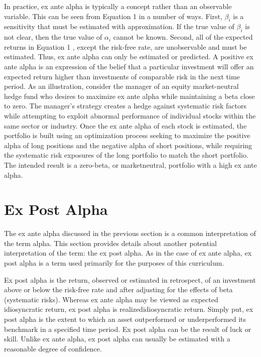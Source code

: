 \documentclass[11pt]{article}
\begin{document}
In practice, ex ante alpha is typically a concept rather than an observable variable. This can be seen from Equation 1 in a number of ways. First, $\beta_{i}$ is a sensitivity that must be estimated with approximation. If the true value of $\beta_{i}$ is not clear, then the true value of $\alpha_{i}$ cannot be known. Second, all of the expected returns in Equation 1 , except the risk-free rate, are unobservable and must be estimated. Thus, ex ante alpha can only be estimated or predicted. A positive ex ante alpha is an expression of the belief that a particular investment will offer an expected return higher than investments of comparable risk in the next time period. As an illustration, consider the manager of an equity market-neutral hedge fund who desires to maximize ex ante alpha while maintaining a beta close to zero. The manager's strategy creates a hedge against systematic risk factors while attempting to exploit abnormal performance of individual stocks within the same sector or industry. Once the ex ante alpha of each stock is estimated, the portfolio is built using an optimization process seeking to maximize the positive alpha of long positions and the negative alpha of short positions, while requiring the systematic risk exposures of the long portfolio to match the short portfolio. The intended result is a zero-beta, or marketneutral, portfolio with a high ex ante alpha.

\section*{Ex Post Alpha}
The ex ante alpha discussed in the previous section is a common interpretation of the term alpha. This section provides details about another potential interpretation of the term: the ex post alpha. As in the case of ex ante alpha, ex post alpha is a term used primarily for the purposes of this curriculum.

Ex post alpha is the return, observed or estimated in retrospect, of an investment above or below the risk-free rate and after adjusting for the effects of beta (systematic risks). Whereas ex ante alpha may be viewed as expected idiosyncratic return, ex post alpha is realizedidiosyncratic return. Simply put, ex post alpha is the extent to which an asset outperformed or underperformed its benchmark in a specified time period. Ex post alpha can be the result of luck or skill. Unlike ex ante alpha, ex post alpha can usually be estimated with a reasonable degree of confidence.
\end{document}
